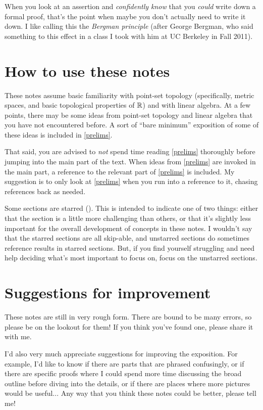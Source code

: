 When you look at an assertion and \emph{confidently know} that you \emph{could} write down a formal proof, that's the point when maybe you don't actually need to write it down. I like calling this the \emph{Bergman principle} (after George Bergman, who said something to this effect in a class I took with him at UC Berkeley in Fall 2011).

\section*{How to use these notes}

These notes assume basic familiarity with point-set topology (specifically, metric spaces, and basic topological properties of $\mathbb{R}$) and with linear algebra. At a few points, there may be some ideas from point-set topology and linear algebra that you have not encountered before. A sort of ``bare minimum'' exposition of some of these ideas is included in \cref{prelims}. 

That said, you are advised to \emph{not} spend time reading \cref{prelims} thoroughly before jumping into the main part of the text. When ideas from \cref{prelims} are invoked in the main part, a reference to the relevant part of \cref{prelims} is included. My suggestion is to only look at \cref{prelims} when you run into a reference to it, chasing references back as needed. 

Some sections are starred (\starred). This is intended to indicate one of two things: either that the section is a little more challenging than others, or that it's slightly less important for the overall development of concepts in these notes. I wouldn't say that the starred sections are all skip-able, and unstarred sections do sometimes reference results in starred sections. But, if you find yourself struggling and need help deciding what's most important to focus on, focus on the unstarred sections. 

\section*{Suggestions for improvement}

These notes are still in very rough form. There are bound to be many errors, so please be on the lookout for them! If you think you've found one, please share it with me. 

I'd also very much appreciate suggestions for improving the exposition. For example, I'd like to know if there are parts that are phrased confusingly, or if there are specific proofs where I could spend more time discussing the broad outline before diving into the details, or if there are places where more pictures would be useful... Any way that you think these notes could be better, please tell me!
